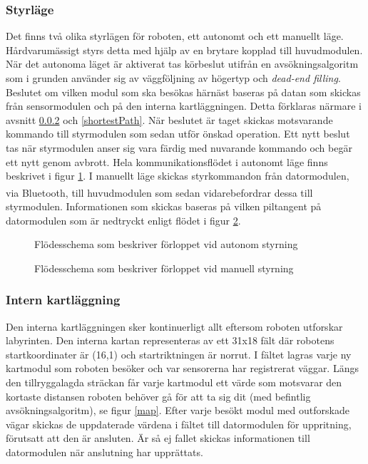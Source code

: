 \documentclass[11pt]{article}
\begin{document}
\begin{flushleft}
\subsubsection{Styrläge}
Det finns två olika styrlägen för roboten, ett autonomt och ett manuellt läge. Hårdvarumässigt styrs detta med hjälp av en brytare kopplad till huvudmodulen. När det autonoma läget är aktiverat tas körbeslut utifrån en avsökningsalgoritm som i grunden använder sig av väggföljning av högertyp och \emph{dead-end filling}. Beslutet om vilken modul som ska besökas härnäst baseras på datan som skickas från sensormodulen och på den interna kartläggningen. Detta förklaras närmare i avsnitt \ref{search} och \ref{shortestPath}. När beslutet är taget skickas motsvarande kommando till styrmodulen som sedan utför önskad operation. Ett nytt beslut tas när styrmodulen anser sig vara färdig med nuvarande kommando och begär ett nytt genom avbrott. Hela kommunikationsflödet i autonomt läge finns beskrivet i figur \ref{autonomousMode}. I manuellt läge skickas styrkommandon från datormodulen, via Bluetooth\textsuperscript{\circledR}, till huvudmodulen som sedan vidarebefordrar dessa till styrmodulen. Informationen som skickas baseras på vilken piltangent på datormodulen som är nedtryckt enligt flödet i figur \ref{manualMode}.

\begin{figure}[htbp]
\centering
\noindent\resizebox{0.9\linewidth}{!}{
}
\cprotect\caption{Flödesschema som beskriver förloppet vid autonom styrning \label{autonomousMode}} 
\end{figure}

\begin{figure}[htbp]
\centering
\noindent\resizebox{0.9\linewidth}{!}{
}
\cprotect\caption{Flödesschema som beskriver förloppet vid manuell styrning \label{manualMode}} 
\end{figure}

\subsubsection{Intern kartläggning} \label{search}
Den interna kartläggningen sker kontinuerligt allt eftersom roboten utforskar labyrinten. Den interna kartan representeras av ett 31x18 fält där robotens startkoordinater är (16,1) och startriktningen är norrut. I fältet lagras varje ny kartmodul som roboten besöker och var sensorerna har registrerat väggar. Längs den tillryggalagda sträckan får varje kartmodul ett värde som motsvarar den kortaste distansen roboten behöver gå för att ta sig dit (med befintlig avsökningsalgoritm), se figur \ref{map}. Efter varje besökt modul med outforskade vägar skickas de uppdaterade värdena i fältet till datormodulen för uppritning, förutsatt att den är ansluten. Är så ej fallet skickas informationen till datormodulen när anslutning har upprättats. 


\end{flushleft}
\end{document}
